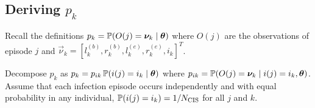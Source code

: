 \documentclass[thesis.tex]{subfiles}
\begin{document}

\subsection{Deriving $p_k$}

Recall the definitions $p_k = \operatorname{\mathbb{P}}(O(j) = \bm{\nu}_k \mid \bm{\theta})$ where $O(j)$ are the observations of episode $j$ and $\vec{\nu}_k = [l^{(b)}_k, r^{(b)}_k, l^{(e)}_k, r^{(e)}_k, i_k]^T$.

Decompose $p_k$ as $p_k = p_{ik} \operatorname{\mathbb{P}}(i(j) = i_k \mid \bm{\theta})$
where $p_{ik} = \operatorname{\mathbb{P}}(O(j) = \bm{\nu}_k \mid i(j) = i_k, \bm{\theta})$.
Assume that each infection episode occurs independently and with equal probability in any individual, \ie $\operatorname{\mathbb{P}}(i(j) = i_k) = 1/N_\text{CIS}$ for all $j$ and $k$.
\end{document}
